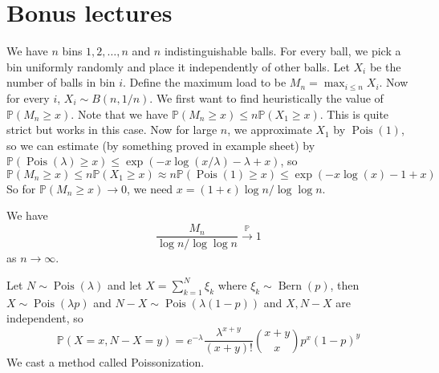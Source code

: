 \section{Bonus lectures}
We have $n$ bins $1,2,\ldots,n$ and $n$ indistinguishable balls.
For every ball, we pick a bin uniformly randomly and place it independently of other balls.
Let $X_i$ be the number of balls in bin $i$.
Define the maximum load to be $M_n=\max_{i\le n}X_i$.
Now for every $i$, $X_i\sim B(n,1/n)$.
We first want to find heuristically the value of $\mathbb P(M_n\ge x)$.
Note that we have $\mathbb P(M_n\ge x)\le n\mathbb P(X_1\ge x)$.
This is quite strict but works in this case.
Now for large $n$, we approximate $X_1$ by $\operatorname{Pois}(1)$, so we can estimate (by something proved in example sheet) by $\mathbb P(\operatorname{Pois}(\lambda)\ge x)\le\exp(-x\log(x/\lambda)-\lambda+x)$, so
$$\mathbb P(M_n\ge x)\le n\mathbb P(X_1\ge x)\approx n\mathbb P(\operatorname{Pois}(1)\ge x)\le \exp(-x\log(x)-1+x)$$
So for $\mathbb P(M_n\ge x)\to 0$, we need $x=(1+\epsilon)\log n/\log\log n$.
\begin{theorem}
    We have
    $$\frac{M_n}{\log n/\log\log n}\xrightarrow{\mathbb P}1$$
    as $n\to\infty$.
\end{theorem}
Let $N\sim\operatorname{Pois}(\lambda)$ and let $X=\sum_{k=1}^N\xi_k$ where $\xi_k\sim\operatorname{Bern}(p)$, then $X\sim\operatorname{Pois}(\lambda p)$ and $N-X\sim\operatorname{Pois}(\lambda(1-p))$ and $X,N-X$ are independent, so
$$\mathbb P(X=x,N-X=y)=e^{-\lambda}\frac{\lambda^{x+y}}{(x+y)!}\binom{x+y}{x}p^x(1-p)^y$$
We cast a method called Poissonization.
